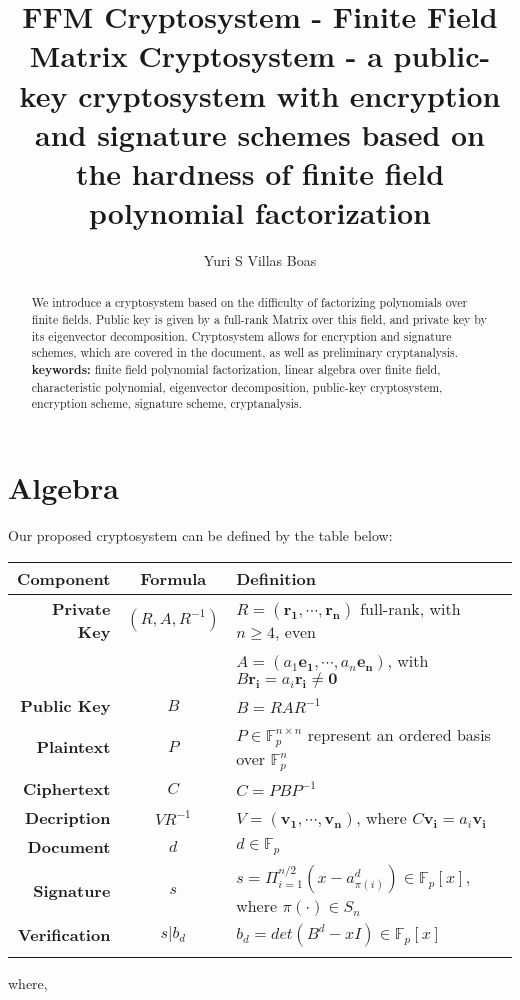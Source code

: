 \documentclass[a4paper,10pt]{article}
\theoremstyle{plain}
\theoremstyle{definition}
\theoremstyle{named}
\begin{document}
\title{FFM Cryptosystem - Finite Field Matrix Cryptosystem - a public-key cryptosystem with encryption and signature schemes based on the hardness of finite field polynomial factorization}
\author{Yuri S Villas Boas}

\maketitle

\begin{abstract}
We introduce a cryptosystem based on the difficulty of factorizing polynomials over finite fields. Public key is given by a full-rank Matrix over this field, and private key by its eigenvector decomposition. Cryptosystem allows for encryption and signature schemes, which are covered in the document, as well as preliminary cryptanalysis.\\

\textbf{keywords:} finite field polynomial factorization, linear algebra over finite field, characteristic polynomial, eigenvector decomposition, public-key cryptosystem, encryption scheme, signature scheme, cryptanalysis.
\end{abstract}

\section{Algebra}

Our proposed cryptosystem can be defined by the table below:
\begin{flushleft}
 \begin{tabular}{|r|c|l|}
    \hline
    \textbf{Component} & \textbf{Formula} & \textbf{Definition}\\
    \hline
     \textbf{Private Key} & $(R, A, R^{-1})$ & $R = \left(\mathbf{r_1}, \cdots, \mathbf{r_n}\right)$ full-rank, with $n \geq 4$, even\\
     &  & $A = \left(a_1\mathbf{e_1}, \cdots, a_n\mathbf{e_n} \right)$, with $B\mathbf{r_i} = a_i\mathbf{r_i} \neq \mathbf{0}$\\
     \hline
     \textbf{Public Key} & $B$ & $B = RAR^{-1}$\\
     \hline
        \textbf{Plaintext} & $P$ & $P\in \mathbb{F}_p^{n\times n}$ represent an ordered basis over $\mathbb{F}_p^n$\\
     \hline
    \textbf{Ciphertext} & $C$ & $C = PBP^{-1}$\\
     \hline
    \textbf{Decription} & $VR^{-1}$ & $V = \left(\mathbf{v_1}, \cdots, \mathbf{v_n}\right)$, where $C\mathbf{v_i} = a_i\mathbf{v_i}$\\
     \hline
    \textbf{Document} & $d$ & $d \in \mathbb{F}_p$\\
     \hline
    \textbf{Signature} & $s$ & $s = \Pi_{i = 1}^{n/2} (x-a_{\pi(i)}^d) \in \mathbb{F}_p[x]$, where $\pi(\cdot) \in S_n$\\
     \hline
    \textbf{Verification} & $s | b_d$ & $b_d = det\left(B^d-xI\right) \in \mathbb{F}_p[x]$\\
    \hline
    \multicolumn{3}{c}{}
\label{tab:notation}
\end{tabular}
\end{flushleft}
where,
\end{document}
